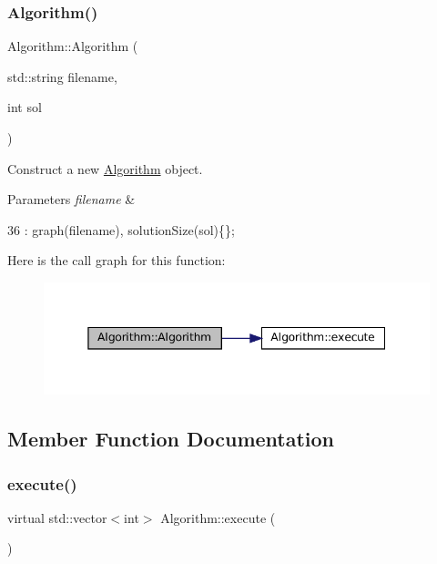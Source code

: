 \subsubsection{\texorpdfstring{Algorithm()}{Algorithm()}}
{\footnotesize\ttfamily Algorithm\+::\+Algorithm (\begin{DoxyParamCaption}\item[{std\+::string}]{filename,  }\item[{int}]{sol }\end{DoxyParamCaption})\hspace{0.3cm}{\ttfamily [inline]}}



Construct a new \hyperlink{classAlgorithm}{Algorithm} object. 


\begin{DoxyParams}{Parameters}
{\em filename} & \\
\hline
\end{DoxyParams}

\begin{DoxyCode}
36 : graph(filename), solutionSize(sol)\{\};
\end{DoxyCode}
Here is the call graph for this function\+:
\nopagebreak
\begin{figure}[H]
\begin{center}
\leavevmode
\includegraphics[width=345pt]{classAlgorithm_a3c199c8528aae86f06ac515d5102fa09_cgraph}
\end{center}
\end{figure}


\subsection{Member Function Documentation}
\mbox{\label{classAlgorithm_af6ea9eb9a6dbd41896e3fd7dabac096b}} 
\subsubsection{\texorpdfstring{execute()}{execute()}}
{\footnotesize\ttfamily virtual std\+::vector$<$int$>$ Algorithm\+::execute (\begin{DoxyParamCaption}{ }\end{DoxyParamCaption})\hspace{0.3cm}{\ttfamily [pure virtual]}}



